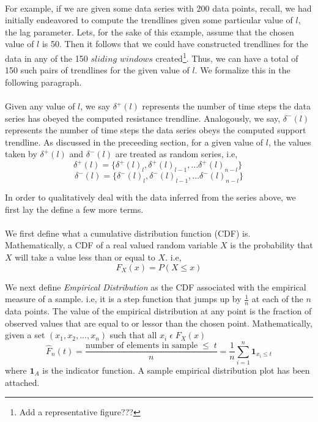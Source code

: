 \documentclass[letterpaper, 12pt] {article}
\begin{document}
	\paragraph{}
	For example, if we are given some data series with 200 data points, recall, we had initially endeavored to compute the trendlines given some particular value of $l$, the lag parameter. Lets, for the sake of this example, assume that the chosen value of $l$ is 50. Then it follows that we could have constructed trendlines for the data in any of the 150 $sliding$ $windows$ created\footnote{Add a representative figure???}. Thus, we can have a total of 150 such pairs of trendlines for the given value of $l$. We formalize this in the following paragraph.
	
	\paragraph{}
	Given any value of $l$, we say $\delta^+(l)$ represents the number of time steps the data series has obeyed the computed resistance trendline. Analogously, we say, $\delta^-(l)$ represents the number of time steps the data series obeys the computed support trendline. As discussed in the preceeding section, for a given value of $l$, the values taken by $\delta^+(l)$ and $\delta^-(l)$ are treated as random series, i.e, 
	$$\delta^+(l) = \{\delta^+(l)_l, \delta^+(l)_{l-1}, ... \delta^+(l)_{n-l}\} \; $$
	$$\delta^-(l) = \{\delta^-(l)_l, \delta^-(l)_{l-1}, ... \delta^-(l)_{n-l}\}$$ 
	
	In order to qualitatively deal with the data inferred from the series above, we first lay the define a few more terms. 
	
	\paragraph{}
	We first define what a cumulative distribution function (CDF) is. Mathematically, a CDF of a real valued random variable $X$ is the probability that $X$ will take a value less than or equal to $X$. i.e, 
	$$F_X(x) = P(X \leq x)$$  
	
	We next define \textit{Empirical Distribution} as the CDF associated with the empirical measure of a sample. i.e, it is a step function that jumps up by $\frac{1}{n}$ at each of the $n$ data points. The value of the empirical distribution at any point is the fraction of observed values that are equal to or lessor than the chosen point. Mathematically, given a set $(x_1, x_2, ..., x_n)$ such that all $x_i\; \epsilon \; F_X(x)$ 
	$$\hat{F}_n (t) = \frac{\text{number of elements in sample}\; \leq\; t}{n} = \frac{1}{n}\sum_{i = 1}^{n} \textbf{1}_{x_{i} \leq t}  $$  
	where $\textbf{1}_A$ is the indicator function. A sample empirical distribution plot has been attached.
	
\end{document}
